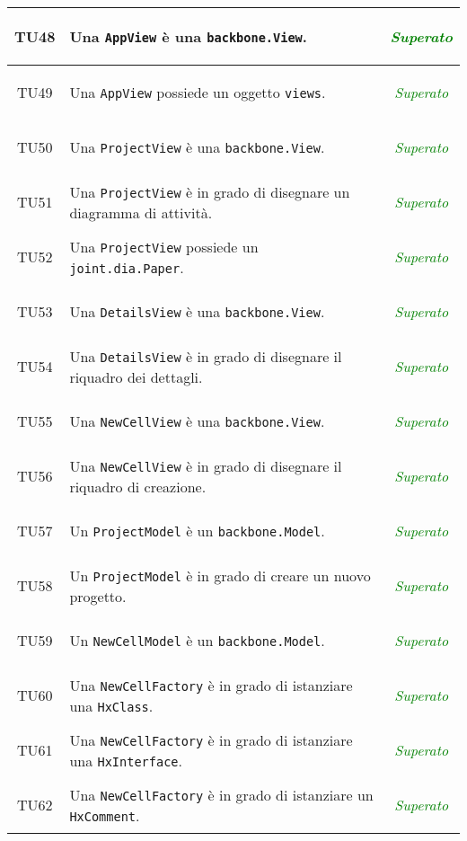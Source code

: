 \begin{longtable}{|c|>{}m{8cm}|c|}
\hypertarget{TU48}{TU48} & Una \texttt{AppView} è una \texttt{backbone.View}. & \textcolor{Green}{\textit{Superato}}\\ \hline
\hypertarget{TU49}{TU49} & Una \texttt{AppView} possiede un oggetto \texttt{views}. & \textcolor{Green}{\textit{Superato}}\\ \hline
\hypertarget{TU50}{TU50} & Una \texttt{ProjectView} è una \texttt{backbone.View}. & \textcolor{Green}{\textit{Superato}}\\ \hline
\hypertarget{TU51}{TU51} & Una \texttt{ProjectView} è in grado di disegnare un diagramma di attività. & \textcolor{Green}{\textit{Superato}}\\ \hline
\hypertarget{TU52}{TU52} & Una \texttt{ProjectView} possiede un \texttt{joint.dia.Paper}. & \textcolor{Green}{\textit{Superato}}\\ \hline
\hypertarget{TU53}{TU53} & Una \texttt{DetailsView} è una \texttt{backbone.View}. & \textcolor{Green}{\textit{Superato}}\\ \hline
\hypertarget{TU54}{TU54} & Una \texttt{DetailsView} è in grado di disegnare il riquadro dei dettagli. & \textcolor{Green}{\textit{Superato}}\\ \hline
\hypertarget{TU55}{TU55} & Una \texttt{NewCellView} è una \texttt{backbone.View}. & \textcolor{Green}{\textit{Superato}}\\ \hline
\hypertarget{TU56}{TU56} & Una \texttt{NewCellView} è in grado di disegnare il riquadro di creazione. & \textcolor{Green}{\textit{Superato}}\\ \hline
\hypertarget{TU57}{TU57} & Un \texttt{ProjectModel} è un \texttt{backbone.Model}. & \textcolor{Green}{\textit{Superato}}\\ \hline
\hypertarget{TU58}{TU58} & Un \texttt{ProjectModel} è in grado di creare un nuovo progetto. & \textcolor{Green}{\textit{Superato}}\\ \hline
\hypertarget{TU59}{TU59} & Un \texttt{NewCellModel} è un \texttt{backbone.Model}. & \textcolor{Green}{\textit{Superato}}\\ \hline
\hypertarget{TU60}{TU60} & Una \texttt{NewCellFactory} è in grado di istanziare una \texttt{HxClass}. & \textcolor{Green}{\textit{Superato}}\\ \hline
\hypertarget{TU61}{TU61} & Una \texttt{NewCellFactory} è in grado di istanziare una \texttt{HxInterface}. & \textcolor{Green}{\textit{Superato}}\\ \hline
\hypertarget{TU62}{TU62} & Una \texttt{NewCellFactory} è in grado di istanziare un \texttt{HxComment}. & \textcolor{Green}{\textit{Superato}}\\ \hline

\end{longtable}
